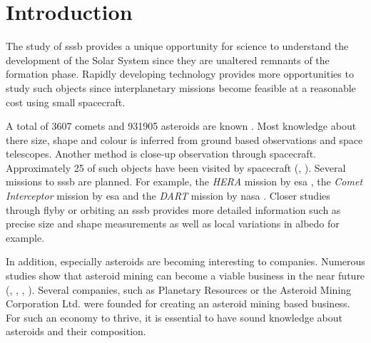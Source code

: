 \section{Introduction} \label{sec:introduction}

The study of \gls{sssb} provides a unique opportunity for science to understand the development of the Solar System since they are unaltered remnants of the formation phase. Rapidly developing technology provides more opportunities to study such objects since interplanetary missions become feasible at a reasonable cost using small spacecraft. 

A total of \SI{3607}{} comets and \SI{931905}{} asteroids are known \cite{nasaSBD}. Most knowledge about there size, shape and colour is inferred from ground based observations and space telescopes. Another method is close-up observation through spacecraft. Approximately \SI{25}{} of such objects have been visited by spacecraft (\cite{wikipediaVisitedList}, ). Several missions to \gls{sssb} are planned. For example, the \textit{HERA} mission by \gls{esa} \cite{hera}, the \textit{Comet Interceptor} mission by \gls{esa} \cite{snodgrass2019europeanCI} and the \textit{DART} mission by \gls{nasa} \cite{talbert_2017DART}. Closer studies through flyby or orbiting an \gls{sssb} provides more detailed information such as precise size and shape measurements as well as local variations in albedo for example.



In addition, especially asteroids are becoming interesting to companies. Numerous studies show that asteroid mining can become a viable business in the near future (\cite{andrews2015defining}, \cite{busch2004profitable}, \cite{weinzierl2018EconomicFrontier}, \cite{pittman2017deep}). Several companies, such as Planetary Resources \cite{lewicki2013planetary} or the Asteroid Mining Corporation Ltd. \cite{asteroidminingcorporation} were founded for creating an asteroid mining based business. For such an economy to thrive, it is essential to have sound knowledge about asteroids and their composition.

